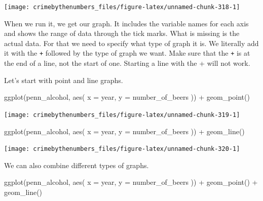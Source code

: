 \documentclass[
  a4paper,
]{krantz}
\makeatletter
\newenvironment{Shaded}{\begin{snugshade}}{\end{snugshade}}
\newcommand{\AttributeTok}[1]{\textcolor[rgb]{0.61,0.61,0.61}{#1}}
\newcommand{\FunctionTok}[1]{\textcolor[rgb]{0,0,0}{#1}}
\newcommand{\NormalTok}[1]{#1}
\newcommand{\SpecialCharTok}[1]{\textcolor[rgb]{0,0,0}{#1}}
\newenvironment{kframe}{%
\medskip{}
\setlength{\fboxsep}{.8em}
 \def\at@end@of@kframe{}%
 \ifinner\ifhmode%
  \def\at@end@of@kframe{\end{minipage}}%
  \begin{minipage}{\columnwidth}%
 \fi\fi%
 \def\FrameCommand##1{\hskip\@totalleftmargin \hskip-\fboxsep
 \colorbox{shadecolor}{##1}\hskip-\fboxsep
     \hskip-\linewidth \hskip-\@totalleftmargin \hskip\columnwidth}%
 \MakeFramed {\advance\hsize-\width
   \@totalleftmargin\z@ \linewidth\hsize
   \@setminipage}}%
 {\par\unskip\endMakeFramed%
 \at@end@of@kframe}
\renewenvironment{Shaded}{\begin{kframe}}{\end{kframe}}
\makeatother
\begin{document}
\begin{center}\texttt{[image: crimebythenumbers\_files/figure-latex/unnamed-chunk-318-1]} \end{center}

When we run it, we get our graph. It includes the variable
names for each axis and shows the range of data through the
tick marks. What is missing is the actual data. For that we
need to specify what type of graph it is. We literally add
it with the \texttt{+} followed by the type of graph we
want. Make sure that the \texttt{+} is at the end of a line,
not the start of one. Starting a line with the + will not
work.

Let's start with point and line graphs.

\begin{Shaded}
\begin{Highlighting}[]
\FunctionTok{ggplot}\NormalTok{(penn\_alcohol, }\FunctionTok{aes}\NormalTok{(}
  \AttributeTok{x =}\NormalTok{ year,}
  \AttributeTok{y =}\NormalTok{ number\_of\_beers}
\NormalTok{)) }\SpecialCharTok{+}
  \FunctionTok{geom\_point}\NormalTok{()}
\end{Highlighting}
\end{Shaded}

\begin{center}\texttt{[image: crimebythenumbers\_files/figure-latex/unnamed-chunk-319-1]} \end{center}

\begin{Shaded}
\begin{Highlighting}[]
\FunctionTok{ggplot}\NormalTok{(penn\_alcohol, }\FunctionTok{aes}\NormalTok{(}
  \AttributeTok{x =}\NormalTok{ year,}
  \AttributeTok{y =}\NormalTok{ number\_of\_beers}
\NormalTok{)) }\SpecialCharTok{+}
  \FunctionTok{geom\_line}\NormalTok{()}
\end{Highlighting}
\end{Shaded}

\begin{center}\texttt{[image: crimebythenumbers\_files/figure-latex/unnamed-chunk-320-1]} \end{center}

We can also combine different types of graphs.

\begin{Shaded}
\begin{Highlighting}[]
\FunctionTok{ggplot}\NormalTok{(penn\_alcohol, }\FunctionTok{aes}\NormalTok{(}
  \AttributeTok{x =}\NormalTok{ year,}
  \AttributeTok{y =}\NormalTok{ number\_of\_beers}
\NormalTok{)) }\SpecialCharTok{+}
  \FunctionTok{geom\_point}\NormalTok{() }\SpecialCharTok{+}
  \FunctionTok{geom\_line}\NormalTok{()}
\end{Highlighting}
\end{Shaded}
\end{document}
